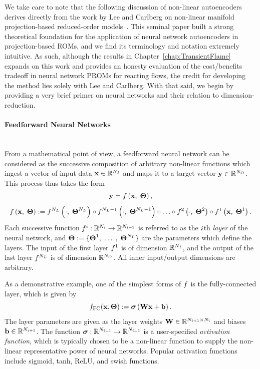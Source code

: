 We take care to note that the following discussion of non-linear autoencoders derives directly from the work by Lee and Carlberg on non-linear manifold projection-based reduced-order models~\cite{Lee2020}. This seminal paper built a strong theoretical foundation for the application of neural network autoencoders in projection-based ROMs, and we find its terminology and notation extremely intuitive. As such, although the results in Chapter~\ref{chap:TransientFlame} expands on this work and provides an honesty evaluation of the cost/benefits tradeoff in neural network PROMs for reacting flows, the credit for developing the method lies solely with Lee and Carlberg. With that said, we begin by providing a very brief primer on neural networks and their relation to dimension-reduction.

\paragraph*{Feedforward Neural Networks}\mbox{}\\
%
From a mathematical point of view, a feedforward neural network can be considered as the successive composition of arbitrary non-linear functions which ingest a vector of input data $\nnInput \inROne{\numNNInput}$ and maps it to a target vector $\nnOutput \inROne{\numNNOutput}$. This process thus takes the form
%
\begin{equation}
	\nnOutput = \nnLayerFunc{\nnInput, \; \nnParams},
\end{equation}
\begin{equation}
	\nnLayerFunc{\nnInput, \; \nnParams} \defEq \nnLayerFuncIdx{\cdot, \; \nnParams^{\numLayers}}{\numLayers} \circ \nnLayerFuncIdx{\cdot, \; \nnParams^{\numLayers-1}}{\numLayers-1} \circ \hdots \circ \nnLayerFuncIdx{\cdot, \; \nnParams^{2}}{2} \circ \nnLayerFuncIdx{\nnInput, \; \nnParams^{1}}{1}.
\end{equation}
%
Each successive function $\funcMap{\nnLayerIdx{\dummyIdx}}{\ROne{N_{\dummyIdx}}}{\ROne{N_{\dummyIdx+1}}}$ is referred to as the $\dummyIdx$th \textit{layer} of the neural network, and $\nnParams \defEq \{\nnParams^{1}, \; \hdots \;, \; \nnParams^{\numLayers}\}$ are the parameters which define the layers. The input of the first layer $\nnLayer^1$ is of dimension $\ROne{\numNNInput}$, and the output of the last layer $\nnLayer^{\numLayers}$ is of dimension $\ROne{\numNNOutput}$. All inner input/output dimensions are arbitrary.

As a demonstrative example, one of the simplest forms of $\nnLayer$ is the fully-connected layer, which is given by
%
\begin{equation}
	\nnLayer_{\text{FC}}(\nnInput, \nnParams) \defEq \actFunc{\nnWeights \nnInput + \nnBias}.
\end{equation}
%
The layer parameters are given as the layer weights $\nnWeights \inRTwo{N_{\dummyIdx+1}}{N_{\dummyIdx}}$ and biases $\nnBias \inROne{N_{\dummyIdx+1}}$. The function $\funcMap{\nnAct}{\ROne{N_{\dummyIdx+1}}}{\ROne{N_{\dummyIdx+1}}}$ is a user-specified \textit{activation function}, which is typically chosen to be a non-linear function to supply the non-linear representative power of neural networks. Popular activation functions include sigmoid, tanh, ReLU, and swish functions.

